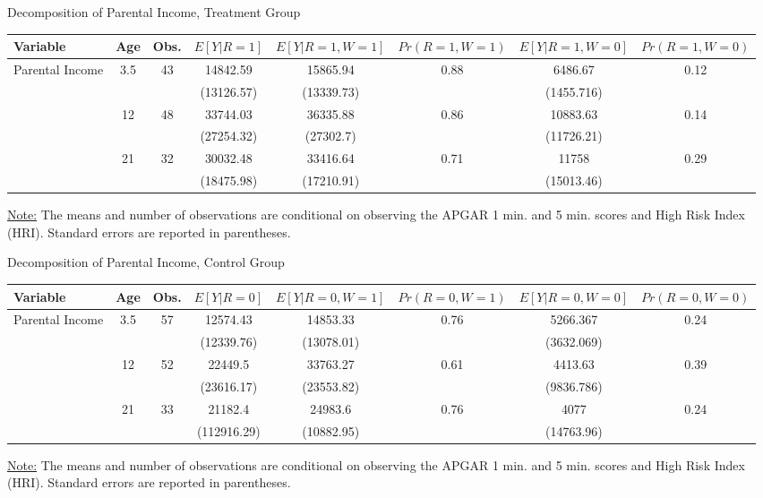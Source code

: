 \documentclass[12pt]{article}
\begin{document}
\begin{threeparttable}[H] \caption{Decomposition of Parental Income, Treatment Group} \label{tab:treat-p_inc}	
\begin{scriptsize}
\centering
	\begin{tabular}{lccccccc}
	\toprule
	Variable & Age & Obs. & $E[Y|R=1]$ & $E[Y|R=1,W=1]$ & $Pr(R=1,W=1)$ & $E[Y|R=1,W=0]$ & $Pr(R=1,W=0)$ \\ \midrule
	Parental Income & 3.5 & 43 & 14842.59  & 15865.94 & 0.88 & 6486.67 & 0.12 \\
	& & & (13126.57) & (13339.73) & & (1455.716)  \\
						& 12 & 48 & 33744.03  & 36335.88 & 0.86 & 10883.63 & 0.14 \\
	& & & (27254.32) & (27302.7) & & (11726.21)   \\					
						& 21 & 32 & 30032.48 & 33416.64 & 0.71 & 11758 & 0.29 \\
	& & & (18475.98) &  (17210.91) & & (15013.46) \\					 \bottomrule
	\end{tabular}
	\begin{tablenotes}
\underline{Note:} The means and number of observations are conditional on observing the APGAR 1 min. and 5 min. scores and High Risk Index (HRI). Standard errors are reported in parentheses.
\end{tablenotes}
\end{scriptsize}
\end{threeparttable}

\hspace{1cm}

\begin{threeparttable}[H] \caption{Decomposition of Parental Income, Control Group}	\label{tab:control-p_inc}
\begin{scriptsize}
\centering
	\begin{tabular}{lccccccc}
	\toprule
	Variable & Age & Obs. & $E[Y|R=0]$ & $E[Y|R=0,W=1]$ & $Pr(R=0,W=1)$ & $E[Y|R=0,W=0]$ & $Pr(R=0,W=0)$ \\ \midrule
	Parental Income & 3.5 & 57 & 12574.43  & 14853.33  & 0.76 & 5266.367 & 0.24 \\
	& & & (12339.76) & (13078.01) & & (3632.069)  \\
						& 12 & 52 & 22449.5  & 33763.27 & 0.61 & 4413.63  & 0.39 \\
	& & & (23616.17) & (23553.82) & & (9836.786)   \\					
						& 21 & 33 & 21182.4 & 24983.6  & 0.76 &  4077  & 0.24 \\
	& & & (112916.29) &  (10882.95) & & (14763.96) \\					 \bottomrule
	\end{tabular}
	\begin{tablenotes}
\underline{Note:} The means and number of observations are conditional on observing the APGAR 1 min. and 5 min. scores and High Risk Index (HRI). Standard errors are reported in parentheses.
\end{tablenotes}
\end{scriptsize}
\end{threeparttable}
\end{document}
